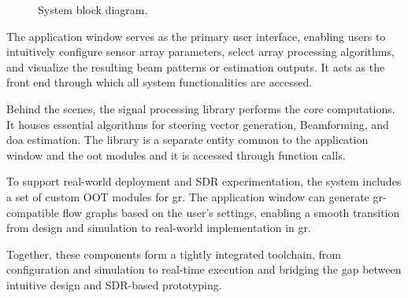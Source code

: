 \begin{figure}[H]
	\centering
	\caption{System block diagram.}
\end{figure}

The application window serves as the primary user interface, enabling users to intuitively configure sensor array parameters, select array processing algorithms, and visualize the resulting beam patterns or estimation outputs. It acts as the front end through which all system functionalities are accessed.

Behind the scenes, the signal processing library performs the core computations. It houses essential algorithms for steering vector generation, Beamforming, and \ac{doa} estimation. The library is a separate entity common to the application window and the \ac{oot} modules and it is accessed through function calls.

To support real-world deployment and SDR experimentation, the system includes a set of custom OOT modules for \ac{gr}. The application window can generate \ac{gr}-compatible flow graphs based on the user's settings, enabling a smooth transition from design and simulation to real-world implementation in \ac{gr}.

Together, these components form a tightly integrated toolchain, from configuration and simulation to real-time execution and bridging the gap between intuitive design and SDR-based prototyping.